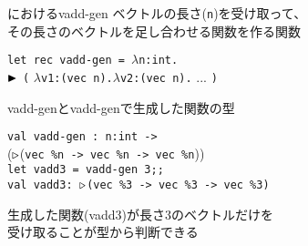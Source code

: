 \documentclass[dvipdfmx,aspectratio=169, 20pt]{beamer}
\begin{document}
\begin{frame}[fragile]{\LMD におけるvadd-gen}
    ベクトルの長さ(\verb|n|)を受け取って、\\その長さのベクトルを足し合わせる関数を作る関数
    \begin{exampleblock}{}
        \hspace{5mm} \verb|let rec vadd-gen = |$\lambda$\verb|n:int.| \\
        \hspace{10mm} ${\mathop{\blacktriangleright}}$ \verb|(| $\lambda$\verb|v1:(vec |\onslide<2->{\underline{\%}}\verb|n).|$\lambda$\verb|v2:(vec |\verb|n).| ... \verb|)|
    \end{exampleblock}
\end{frame}

\begin{frame}[fragile]{vadd-genとvadd-genで生成した関数の型}
    \newcommand{\Vn}{\text{vec}\ \%n}
    \newcommand{\Vt}{\text{vec}\ \%3}
    \begin{exampleblock}{}
        \hspace{5mm} \verb|val vadd-gen : n:int -> | \\
        \hspace{20mm} (${\mathop{\triangleright}}$(\verb|vec %n -> vec %n -> vec %n|)) \\[2mm]
        \hspace{5mm} \verb|let vadd3 = vadd-gen 3;;| \\
        \hspace{5mm} \verb|val vadd3: |${\mathop{\triangleright}}$\verb|(vec %3 -> vec %3 -> vec %3)|
    \end{exampleblock}
    生成した関数(vadd3)が長さ3のベクトルだけを\\受け取ることが型から判断できる
\end{frame}
\end{document}
